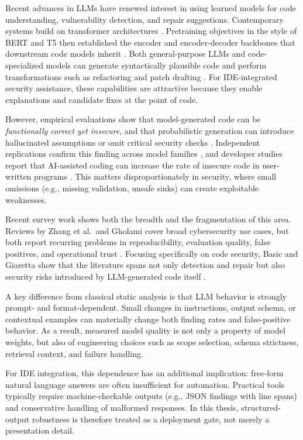 Recent advances in LLMs have renewed interest in using learned models for code understanding, vulnerability detection, and repair suggestions. Contemporary systems build on transformer architectures \cite{vaswani2017attention}. Pretraining objectives in the style of BERT and T5 then established the encoder and encoder-decoder backbones that downstream code models inherit \cite{devlin2019bert,raffel2020t5}. Both general-purpose LLMs and code-specialized models can generate syntactically plausible code and perform transformations such as refactoring and patch drafting \cite{chen2021codex,openai2023gpt4}. For IDE-integrated security assistance, these capabilities are attractive because they enable explanations and candidate fixes at the point of code.

However, empirical evaluations show that model-generated code can be \emph{functionally correct yet insecure}, and that probabilistic generation can introduce hallucinated assumptions or omit critical security checks \cite{pearce2022copilot,ji2023hallucination}. Independent replications confirm this finding across model families \cite{khoury2023secure}, and developer studies report that AI-assisted coding can increase the rate of insecure code in user-written programs \cite{perry2023users,sandoval2023lost}. This matters disproportionately in security, where small omissions (e.g., missing validation, unsafe sinks) can create exploitable weaknesses.

Recent survey work shows both the breadth and the fragmentation of this area. Reviews by Zhang et al.\ and Gholami cover broad cybersecurity use cases, but both report recurring problems in reproducibility, evaluation quality, false positives, and operational trust \cite{zhang2025llmcybersecurity,gholami2024llmcyberreview}. Focusing specifically on code security, Basic and Giaretta show that the literature spans not only detection and repair but also security risks introduced by LLM-generated code itself \cite{basic2025codeSecuritySLR}.

A key difference from classical static analysis is that LLM behavior is strongly prompt- and format-dependent. Small changes in instructions, output schema, or contextual examples can materially change both finding rates and false-positive behavior. As a result, measured model quality is not only a property of model weights, but also of engineering choices such as scope selection, schema strictness, retrieval context, and failure handling.

For IDE integration, this dependence has an additional implication: free-form natural language answers are often insufficient for automation. Practical tools typically require machine-checkable outputs (e.g., JSON findings with line spans) and conservative handling of malformed responses. In this thesis, structured-output robustness is therefore treated as a deployment gate, not merely a presentation detail.

